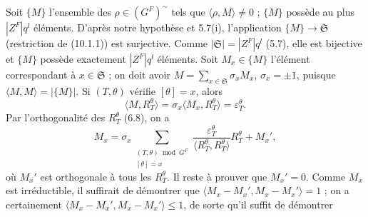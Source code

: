 \documentclass[9pt,twoside]{extarticle}
\begin{document}
{Soit \(\{M\}\) l'ensemble des \(\rho\in(G^F)^{\sim}\) tels que \(\langle\rho,M\rangle\ne0\) ; \(\{M\}\) possède au plus \(|Z^F|q^l\) éléments. D'après notre hypothèse et 5.7(i), l'application \(\{M\}\to\mathfrak S\) (restriction de (10.1.1)) est surjective. Comme \(|\mathfrak S|=|Z^F|q^l\) (5.7), elle est bijective et \(\{M\}\) possède exactement \(|Z^F|q^l\) éléments. Soit \(M_x\in\{M\}\) l'élément correspondant à \(x\in\mathfrak S\) ; on doit avoir \(M=\sum_{x\in\mathfrak S}\sigma_xM_x\), \(\sigma_x=\pm1\), puisque \(\langle M,M\rangle=|\{M\}|\). Si \((T,\theta)\) vérifie \([\theta]=x\), alors \[
\langle M,R_T^\theta\rangle
=
\sigma_x\langle M_x,R_T^\theta\rangle
=
\varepsilon_T^\theta.
\] Par l'orthogonalité des \(R_T^\theta\) (6.8), on a \[
M_x
=
\sigma_x
\sum_{\substack{(T,\theta)\bmod G^F\\{}[\theta]=x}}
\frac{\varepsilon_T^\theta}{\langle R_T^\theta,R_T^\theta\rangle}R_T^\theta
+M_x',
\] où \(M_x'\) est orthogonale à tous les \(R_T^\theta\). Il reste à prouver que \(M_x'=0\). Comme \(M_x\) est irréductible, il suffirait de démontrer que \(\langle M_x-M_x',M_x-M_x'\rangle=1\) ; on a certainement \(\langle M_x-M_x',M_x-M_x'\rangle\le1\), de sorte qu'il suffit de démontrer\par
}
\end{document}
